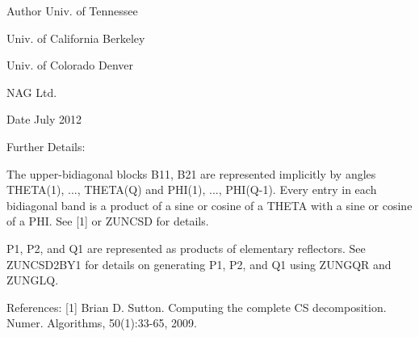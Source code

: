\begin{DoxyAuthor}{Author}
Univ. of Tennessee 

Univ. of California Berkeley 

Univ. of Colorado Denver 

N\+A\+G Ltd. 
\end{DoxyAuthor}
\begin{DoxyDate}{Date}
July 2012 
\end{DoxyDate}
\begin{DoxyParagraph}{Further Details\+: }
\begin{DoxyVerb}  The upper-bidiagonal blocks B11, B21 are represented implicitly by
  angles THETA(1), ..., THETA(Q) and PHI(1), ..., PHI(Q-1). Every entry
  in each bidiagonal band is a product of a sine or cosine of a THETA
  with a sine or cosine of a PHI. See [1] or ZUNCSD for details.

  P1, P2, and Q1 are represented as products of elementary reflectors.
  See ZUNCSD2BY1 for details on generating P1, P2, and Q1 using ZUNGQR
  and ZUNGLQ.\end{DoxyVerb}
 
\end{DoxyParagraph}
\begin{DoxyParagraph}{References\+: }
\mbox{[}1\mbox{]} Brian D. Sutton. Computing the complete C\+S decomposition. Numer. Algorithms, 50(1)\+:33-\/65, 2009. 
\end{DoxyParagraph}
